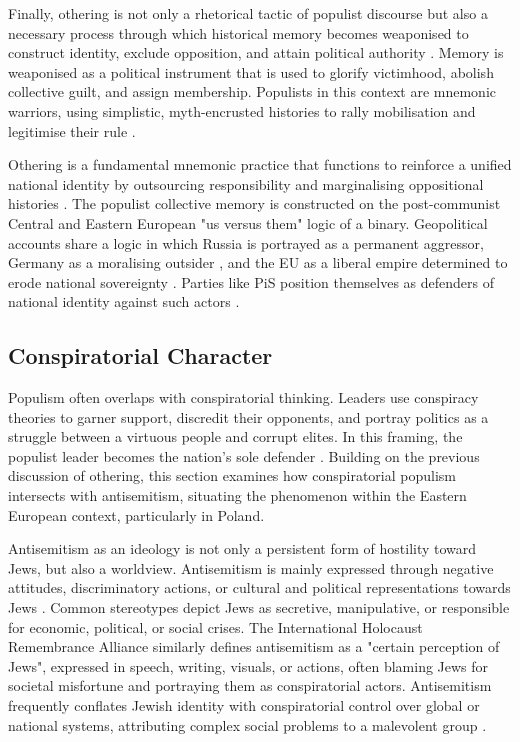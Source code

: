 Finally, othering is not only a rhetorical tactic of populist discourse but also a necessary process through which historical memory becomes weaponised to construct identity, exclude opposition, and attain political authority \citep{subotic_political_2018}. Memory is weaponised as a political instrument that is used to glorify victimhood, abolish collective guilt, and assign membership. Populists in this context are mnemonic warriors, using simplistic, myth-encrusted histories to rally mobilisation and legitimise their rule \citep{bernhard_notitle_2014}.

Othering is a fundamental mnemonic practice that functions to reinforce a unified national identity by outsourcing responsibility and marginalising oppositional histories \citep{subotic_political_2018}. The populist collective memory is constructed on the post-communist Central and Eastern European "us versus them" logic of a binary. Geopolitical accounts share a logic in which Russia is portrayed as a permanent aggressor, Germany as a moralising outsider \citep{riedel_tri-marium_2022}, and the EU as a liberal empire determined to erode national sovereignty \citep{verovsek_caught_2021}. Parties like PiS position themselves as defenders of national identity against such actors \citep{subotic_political_2018}.

\subsection{Conspiratorial Character}

Populism often overlaps with conspiratorial thinking. Leaders use conspiracy theories to garner support, discredit their opponents, and portray politics as a struggle between a virtuous people and corrupt elites. In this framing, the populist leader becomes the nation's sole defender \citep{mudde_populism_2017}. Building on the previous discussion of othering, this section examines how conspiratorial populism intersects with antisemitism, situating the phenomenon within the Eastern European context, particularly in Poland.

Antisemitism as an ideology is not only a persistent form of hostility toward Jews, but also a worldview. Antisemitism is mainly expressed through negative attitudes, discriminatory actions, or cultural and political representations towards Jews \citep{postone_anti-semitism_1980}. Common stereotypes depict Jews as secretive, manipulative, or responsible for economic, political, or social crises. The International Holocaust Remembrance Alliance similarly defines antisemitism as a "certain perception of Jews", expressed in speech, writing, visuals, or actions, often blaming Jews for societal misfortune and portraying them as conspiratorial actors. Antisemitism frequently conflates Jewish identity with conspiratorial control over global or national systems, attributing complex social problems to a malevolent group \citep{ihra_ihra-non-legally-binding-working-definition--antisemitism-1_2016}.


